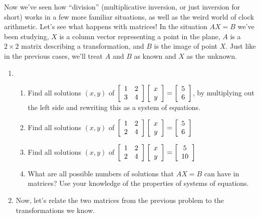 \documentclass[../gatm.tex]{subfiles}
\begin{document}
Now we've seen how ``division'' (multiplicative inversion, or just inversion for short) works in a few more familiar situations, as well as the weird world of clock arithmetic. Let's see what happens with matrices! In the situation $AX=B$ we've been studying, $X$ is a column vector representing a point in the plane, $A$ is a $2\times 2$ matrix describing a transformation, and $B$ is the image of point $X$. Just like in the previous cases, we'll treat $A$ and $B$ as known and $X$ as the unknown.

\begin{enumerate}
\setcounter{enumi}{\value{problem_i}}
\item \begin{enumerate}
\item \label{prob:needed_for_matrix_undo3}Find all solutions $(x,y)$ of $\left[\begin{array}{cc} 1 & 2 \\ 3 & 4 \end{array}\right]\left[\begin{array}{c} x \\ y \end{array}\right]=\left[\begin{array}{c} 5 \\ 6 \end{array}\right]$, by multiplying out the left side and rewriting this as a system of equations.
\item \label{prob:needed_for_matrix_undo4}Find all solutions $(x,y)$ of $\left[\begin{array}{cc} 1 & 2 \\ 2 & 4 \end{array}\right]\left[\begin{array}{c} x \\ y \end{array}\right]=\left[\begin{array}{c} 5 \\ 6 \end{array}\right]$
\item Find all solutions $(x,y)$ of $\left[\begin{array}{cc} 1 & 2 \\ 2 & 4 \end{array}\right]\left[\begin{array}{c} x \\ y \end{array}\right]=\left[\begin{array}{c} 5 \\ 10 \end{array}\right]$
\item What are all possible numbers of solutions that $AX=B$ can have in matrices? Use your knowledge of the properties of systems of equations.
\end{enumerate}
\item Now, let's relate the two matrices from the previous problem to the transformations we know.
\begin{enumerate}

\end{enumerate}
\end{enumerate}
\end{document}
